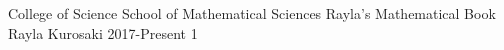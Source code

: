 \documentclass{rayla_textbook}
\begin{document}
    {College of Science}
    {School of Mathematical Sciences}
    {Rayla's Mathematical Book}
    {Rayla Kurosaki}
    {2017-Present}
    {1}

    

    ~\nocite{*}

    \raylaEndBook
\end{document}
